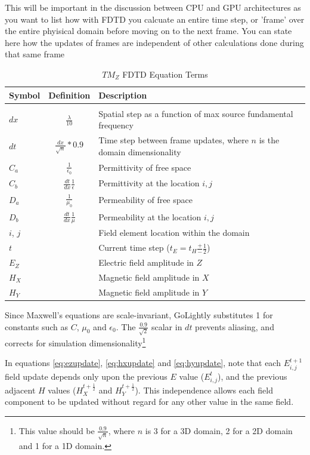 This will be important in the discussion between CPU and GPU architectures as you want to list how with FDTD you calcuate an entire time step, or 'frame' over the entire phyisical domain before moving on to the next frame.  You can state here how the updates of frames are independent of other calculations done during that same frame
\fi

\begin{table}[h!]
	\centering
	\caption{$TM_Z$ FDTD Equation Terms}
	\label{tab:modelColorComponentUsage}
	\begin{tabular}{l | c | l}
		Symbol	& Definition & Description \\
		\hline				\\										 	 
		$dx$ 	& $\frac{\lambda}{10}$ 			& Spatial step as a function of max source  fundamental frequency 					\\
		$dt$ 	& $\frac{dx}{\sqrt{n}} * 0.9$		& Time step between frame updates, where $n$ is the domain dimensionality \\		$C_a$	& $\frac{1}{\epsilon_0}$ & Permittivity of free space	\\
		$C_b$	& $\frac{dt}{dx}  \frac{1}{\epsilon} $ & Permittivity at the location $i,j$\\
		$D_a$	& $\frac{1}{\mu_0}$	& Permeability of free space \\
		$D_b$	& $\frac{dt}{dx}\frac{1}{\mu}$	& Permeability at the location $i,j$\\
		$i$, $j$ 	& &	Field element location within the domain  \\
		$t$   	& &	Current time step ($t_E = t_H \frac{+}{-}\frac{1}{2}$) \\
		$E_Z$ 	& & Electric field amplitude in $Z$ \\
		$H_X$ 	& & Magnetic field amplitude in $X$ \\
		$H_Y$	& & Magnetic field amplitude in $Y$ \\
	\end{tabular}
\end{table}

Since Maxwell's equations are scale-invariant, GoLightly substitutes 1 for constants such as $C$, $\mu_0$ and $\epsilon_0$. The $\frac{0.9}{\sqrt{2}}$ scalar in $dt$ prevents aliasing, and corrects for simulation dimensionality\footnote{This value should be $\frac{0.9}{\sqrt{n}}$, where $n$ is 3 for a 3D domain, 2 for a 2D domain and 1 for a 1D domain.} 

In equations \ref{eq:ezupdate}, \ref{eq:hxupdate} and \ref{eq:hyupdate}, note that each $E_{i,j}^{t+1}$ field update depends only upon the previous $E$ value ($E_{i,j}^{t}$), and the previous adjacent $H$ values ($H_X^{t+\frac{1}{2}}$ and $H_Y^{t+\frac{1}{2}}$). This independence allows each field component to be updated without regard for any other value in the same field.   


